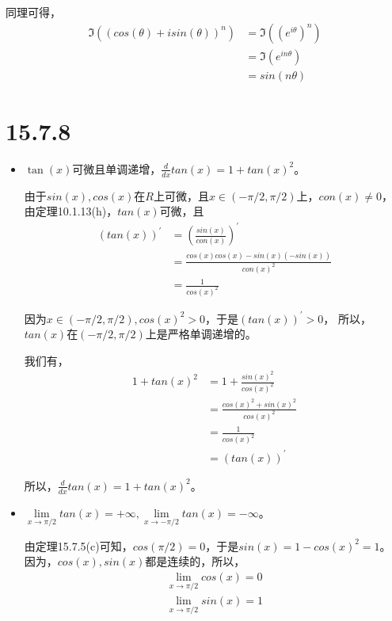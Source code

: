 \documentclass{article}
\begin{document}
同理可得，
\begin{align*}
  \mathfrak{I}((cos(\theta) + isin(\theta))^n) & = \mathfrak{I}((e^{i\theta})^n) \\
                                               & = \mathfrak{I}(e^{in\theta})    \\
                                               & = sin(n\theta)
\end{align*}

\section*{15.7.8}

\begin{itemize}
  \item $\tan(x)$可微且单调递增，$\frac{d}{dx} tan(x) = 1 + tan(x)^2$。

        由于$sin(x), cos(x)$在$R$上可微，且$x \in (-\pi/2, \pi/2)$上，$con(x) \neq 0$，
        由定理10.1.13(h)，$tan(x)$可微，且
        \begin{align*}
          (tan(x))^\prime & = (\frac{sin(x)}{con(x)})^\prime                  \\
                          & = \frac{cos(x)cos(x) - sin(x)(-sin(x))}{con(x)^2} \\
                          & = \frac{1}{cos(x)^2}
        \end{align*}

        因为$x \in (-\pi/2, \pi/2), cos(x)^2 > 0$，于是$(tan(x))^\prime > 0$，
        所以，$tan(x)$在$(-\pi/2, \pi/2)$上是严格单调递增的。

        我们有，
        \begin{align*}
          1 + tan(x)^2 & = 1 + \frac{sin(x)^2}{cos(x)^2}        \\
                       & = \frac{cos(x)^2 + sin(x)^2}{cos(x)^2} \\
                       & = \frac{1}{cos(x)^2}                   \\
                       & = (tan(x))^\prime
        \end{align*}

        所以，$\frac{d}{dx} tan(x) = 1 + tan(x)^2$。

  \item $\lim\limits_{x \to \pi/2} tan(x) = +\infty, \lim\limits_{x \to -\pi/2} tan(x) = -\infty$。

        由定理15.7.5(c)可知，$cos(\pi/2) = 0$，于是$sin(x) = 1 - cos(x)^2 = 1$。
        因为，$cos(x), sin(x)$都是连续的，所以，
        \begin{align*}
          \lim\limits_{x \to \pi/2} cos(x) = 0 \\
          \lim\limits_{x \to \pi/2} sin(x) = 1
        \end{align*}


\end{itemize}
\end{document}
